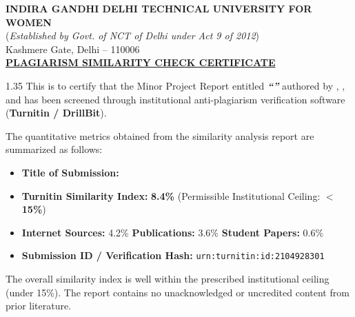 \thispagestyle{empty}
\vspace*{-0.8cm}
\begin{center}
	{\Large\textbf{INDIRA GANDHI DELHI TECHNICAL UNIVERSITY FOR WOMEN}}\\[-0.3em]
	{\normalsize(\textit{Established by Govt. of NCT of Delhi under Act 9 of 2012})}\\[-0.3em]
	{\normalsize Kashmere Gate, Delhi -- 110006}\\[0.4cm]
	{\large\textbf{\underline{PLAGIARISM SIMILARITY CHECK CERTIFICATE}}}\par
\end{center}

\vspace{0.2cm}
\begin{spacing}{1.35}
\noindent This is to certify that the Minor Project Report entitled \textbf{\textit{``\printTitle''}} authored by \textbf{\printStuNameA}, \textbf{\printStuNameB}, and \textbf{\printStuNameC} has been screened through institutional anti-plagiarism verification software (\textbf{Turnitin / DrillBit}).\par

\noindent The quantitative metrics obtained from the similarity analysis report are summarized as follows:
\begin{itemize}
	\item \textbf{Title of Submission:} \printTitle
	\item \textbf{Turnitin Similarity Index:} \textbf{8.4\%} (Permissible Institutional Ceiling: $<$\textbf{15\%})
	\item \textbf{Internet Sources:} 4.2\% \quad \textbf{Publications:} 3.6\% \quad \textbf{Student Papers:} 0.6\%
	\item \textbf{Submission ID / Verification Hash:} \texttt{urn:turnitin:id:2104928301}
\end{itemize}

\noindent The overall similarity index is well within the prescribed institutional ceiling (under 15\%). The report contains no unacknowledged or uncredited content from prior literature.\par
\end{spacing}

